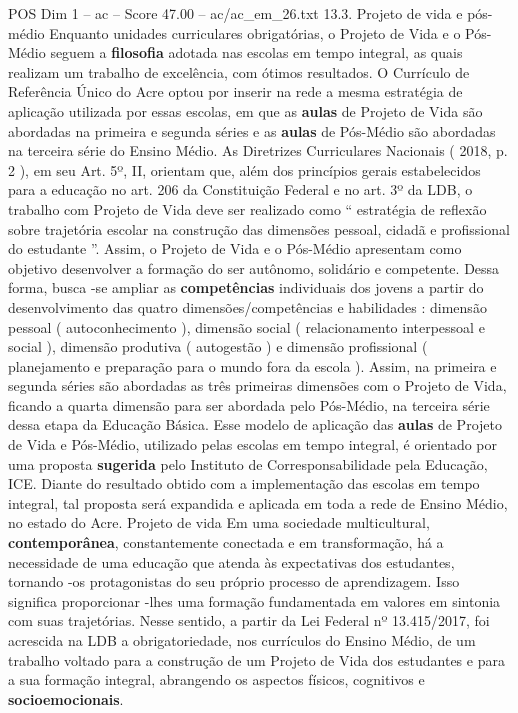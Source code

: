 \begin{textsample}{POS Dim 1 – ac – Score 47.00 – ac/ac\_em\_26.txt}  \label{ex:f1_pos_175}
13.3.
Projeto de vida e pós-médio Enquanto unidades curriculares obrigatórias, o Projeto de Vida e o Pós-Médio seguem a \textbf{filosofia} adotada nas escolas em tempo integral, as quais realizam um trabalho de excelência, com ótimos resultados.
O Currículo de Referência Único do Acre optou por inserir na rede a mesma estratégia de aplicação utilizada por essas escolas, em que as \textbf{aulas} de Projeto de Vida são abordadas na primeira e segunda séries e as \textbf{aulas} de Pós-Médio são abordadas na terceira série do Ensino Médio.
As Diretrizes Curriculares Nacionais ( 2018, p. 2 ), em seu Art. 5º, II, orientam que, além dos princípios gerais estabelecidos para a educação no art. 206 da Constituição Federal e no art. 3º da LDB, o trabalho com Projeto de Vida deve ser realizado como “ estratégia de reflexão sobre trajetória escolar na construção das dimensões pessoal, cidadã e profissional do estudante ”.
Assim, o Projeto de Vida e o Pós-Médio apresentam como objetivo desenvolver a formação do ser autônomo, solidário e competente.
Dessa forma, busca -se ampliar as \textbf{competências} individuais dos jovens a partir do desenvolvimento das quatro dimensões/competências e habilidades : dimensão pessoal ( autoconhecimento ), dimensão social ( relacionamento interpessoal e social ), dimensão produtiva ( autogestão ) e dimensão profissional ( planejamento e preparação para o mundo fora da escola ).
Assim, na primeira e segunda séries são abordadas as três primeiras dimensões com o Projeto de Vida, ficando a quarta dimensão para ser abordada pelo Pós-Médio, na terceira série dessa etapa da Educação Básica.
Esse modelo de aplicação das \textbf{aulas} de Projeto de Vida e Pós-Médio, utilizado pelas escolas em tempo integral, é orientado por uma proposta \textbf{sugerida} pelo Instituto de Corresponsabilidade pela Educação, ICE.
Diante do resultado obtido com a implementação das escolas em tempo integral, tal proposta será expandida e aplicada em toda a rede de Ensino Médio, no estado do Acre.
Projeto de vida Em uma sociedade multicultural, \textbf{contemporânea}, constantemente conectada e em transformação, há a necessidade de uma educação que atenda às expectativas dos estudantes, tornando -os protagonistas do seu próprio processo de aprendizagem.
Isso significa proporcionar -lhes uma formação fundamentada em valores em sintonia com suas trajetórias.
Nesse sentido, a partir da Lei Federal nº 13.415/2017, foi acrescida na LDB a obrigatoriedade, nos currículos do Ensino Médio, de um trabalho voltado para a construção de um Projeto de Vida dos estudantes e para a sua formação integral, abrangendo os aspectos físicos, cognitivos e \textbf{socioemocionais}.

\end{textsample}
